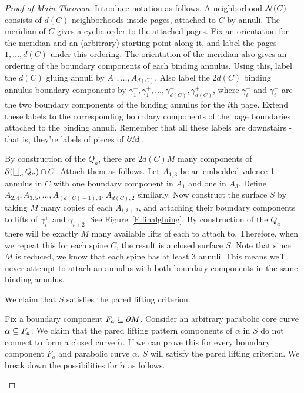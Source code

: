 \begin{proof}[Proof of Main Theorem]
Introduce notation as follows. A neighborhood $\mathcal{N}(C)$ consists of $d(C)$
neighborhoods inside pages, attached to $C$ by annuli. The meridian of $C$
gives a cyclic order to the attached pages.  Fix an orientation for the
meridian and an (arbitrary) starting point along it, and label the pages $1,
\dots, d(C)$ under this ordering.  The orientation of the meridian also gives
an ordering of the boundary components of each binding  annulus.  Using this,
label the $d(C)$ gluing annuli by $A_1,\dots,A_{d(C)}$. Also label the $2d(C)$
binding annulus boundary components by $\gamma_1^-,\gamma_1^+,\dots,
\gamma_{d(C)}^-,\gamma_{d(C)}^+$, where $\gamma_i^-$ and $\gamma_i^+$ are
the two boundary components of the binding annulus for the $i$th page.
Extend these labels to the corresponding boundary components of the page
boundaries attached to the binding annuli.  Remember that all these labels
are downstairs - that is, they're labels of pieces of $\partial M$.

By construction of the $Q_a$, there are $2d(C)M$ many components of
$\partial(\bigsqcup_a Q_a) \cap C$. Attach them as follows. Let $A_{1,3}$ be an
embedded valence 1 annulus in $C$ with one boundary component in $A_1$ and one
in $A_3$. Define $A_{2,4},A_{3,5},\dots,A_{(d(C)-1),1},A_{d(C),2}$ similarly.
Now construct the surface $S$ by taking $M$ many copies of each $A_{i,i+2}$,
and attaching their boundary components to lifts of $\gamma_i^+$ and
$\gamma_{i+2}^-$. See Figure~\ref{F:finalgluing}. By construction of the $Q_a$
there will be exactly $M$ many available lifts of each to attach to. Therefore,
when we repeat this for each spine $C$, the result is a closed surface $S$.
Note that since $M$ is reduced, we know that each spine has at least 3 annuli.
This means we'll never attempt to attach an annulus with both boundary
components in the same binding annulus.


We claim that $S$ satisfies the pared lifting criterion.

Fix a boundary component $F_a \subseteq \partial M$. Consider an arbitrary parabolic core
curve $\alpha \subseteq F_a$. We claim that the pared lifting pattern components of
$\alpha$ in $S$ do not connect to form a closed curve $\widetilde{\alpha}$.  If
we can prove this for every boundary component $F_a$ and parabolic curve
$\alpha$, $S$ will satisfy the pared lifting criterion.  We break down the
possibilities for $\widetilde{\alpha}$ as follows.

\begin{enumerate}


\end{enumerate}
\end{proof}
